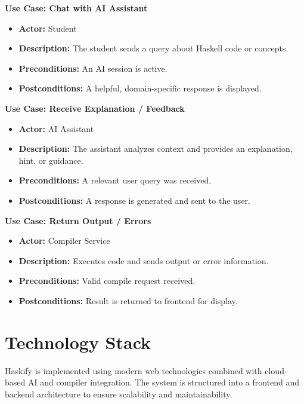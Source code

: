 \vspace{0.3cm}
\textbf{Use Case: Chat with AI Assistant}
\begin{itemize}
  \item \textbf{Actor:} Student
  \item \textbf{Description:} The student sends a query about Haskell code or concepts.
  \item \textbf{Preconditions:} An AI session is active.
  \item \textbf{Postconditions:} A helpful, domain-specific response is displayed.
\end{itemize}

\vspace{0.3cm}
\textbf{Use Case: Receive Explanation / Feedback}
\begin{itemize}
  \item \textbf{Actor:} AI Assistant
  \item \textbf{Description:} The assistant analyzes context and provides an explanation, hint, or guidance.
  \item \textbf{Preconditions:} A relevant user query was received.
  \item \textbf{Postconditions:} A response is generated and sent to the user.
\end{itemize}

\vspace{0.3cm}
\textbf{Use Case: Return Output / Errors}
\begin{itemize}
  \item \textbf{Actor:} Compiler Service
  \item \textbf{Description:} Executes code and sends output or error information.
  \item \textbf{Preconditions:} Valid compile request received.
  \item \textbf{Postconditions:} Result is returned to frontend for display.
\end{itemize}

\newpage
\section{Technology Stack}

Haskify is implemented using modern web technologies combined with cloud-based AI and compiler integration. The system is structured into a frontend and backend architecture to ensure scalability and maintainability.

